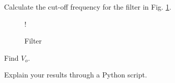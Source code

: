 \documentclass[journal,12pt,twocolumn]{IEEEtran}
\begin{document}
\begin{problem}
Calculate the cut-off frequency for the filter in Fig. \ref{fig6}.  
\label{prob}
\end{problem}
\begin{figure}
       \centering  
       \resizebox {\columnwidth} {!} {

}
    \caption{Filter} \label{fig6}
   \end{figure}
   \begin{problem}
   Find $V_{o}$. 
   \end{problem}
\begin{problem}
Explain your results through a Python script.
\end{problem}
 
\end{document}
